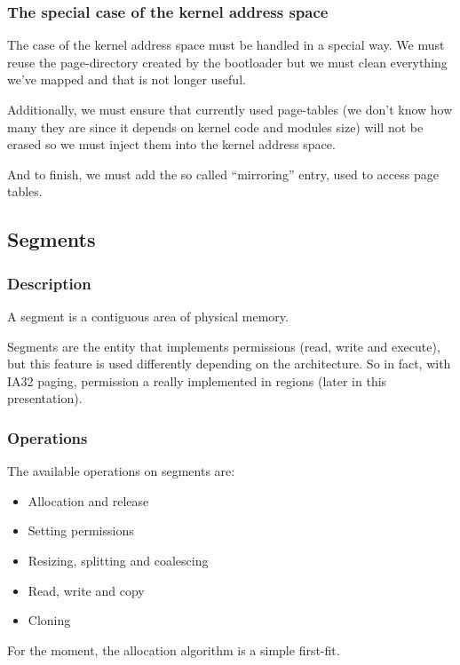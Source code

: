
\begin{frame}
  \frametitle{The special case of the kernel address space}

  The case  of the kernel address  space must be handled  in a special
  way. We must reuse the  page-directory created by the bootloader but
  we must clean everything we've mapped and that is not longer useful.

  \-

  Additionally,  we must  ensure that  currently used  page-tables (we
  don't know  how many they  are since it  depends on kernel  code and
  modules size)  will not be  erased so we  must inject them  into the
  kernel address space.

  \-

  And to finish,  we must add the so  called ``mirroring'' entry, used
  to access page tables.

\end{frame}

%
%

\subsection{Segments}


\begin{frame}
  \frametitle{Description}

  A segment is a contiguous area of physical memory.

  \-

  Segments are the entity that implements permissions (read, write and
  execute),  but this  feature is  used differently  depending  on the
  architecture.  So in  fact, with  IA32 paging,  permission  a really
  implemented in regions (later in this presentation).

\end{frame}


\begin{frame}
  \frametitle{Operations}

  The available operations on segments are:

  \begin{itemize}
  \item Allocation and release
  \item Setting permissions
  \item Resizing, splitting and coalescing
  \item Read, write and copy
  \item Cloning
  \end{itemize}

  \-

  For the moment, the allocation algorithm is a simple first-fit.

\end{frame}


